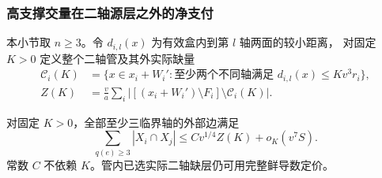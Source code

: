 \subsubsection{高支撑交量在二轴源层之外的净支付}

本小节取 \(n\ge3\)。令 \(d_{i,l}(x)\) 为有效盒内到第 \(l\) 轴两面的较小距离，
对固定 \(K>0\) 定义整个二轴管及其外实际缺量
\[
 \begin{aligned}
 \mathcal C_i(K)&=
 \{x\in x_i+W_i':\text{至少两个不同轴满足 }d_{i,l}(x)\le Kv^3r_i\},\\
 Z(K)&=\frac va\sum_i|[(x_i+W_i')\setminus F_i]\setminus\mathcal C_i(K)|.
 \end{aligned}
\]
\begin{lemma}[高支撑净支付]\label{seventh:high-support}
对固定 \(K>0\)，全部至少三临界轴的外部边满足
\begin{equation}\label{seventh:outside-payment}
 \sum_{q(e)\ge3}|X_i\cap X_j|\le C v^{1/4}Z(K)+o_K(v^7S).
\end{equation}
常数 \(C\) 不依赖 \(K\)。管内已选实际二轴缺层仍可用完整鲜导数定价。
\end{lemma}

